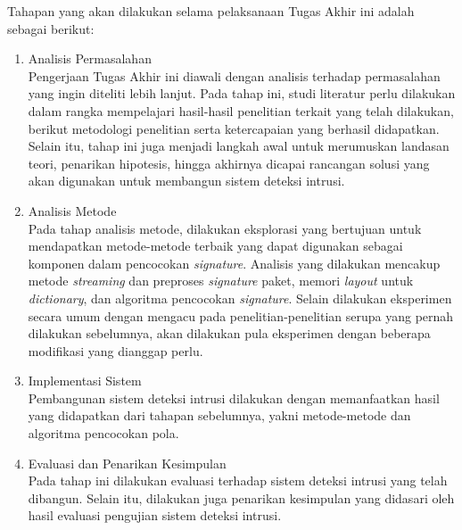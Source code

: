   Tahapan yang akan dilakukan selama pelaksanaan Tugas Akhir ini adalah sebagai berikut:
  \begin{enumerate}

      \item Analisis Permasalahan \\
      Pengerjaan Tugas Akhir ini diawali dengan analisis terhadap permasalahan yang ingin diteliti lebih lanjut. Pada tahap ini, studi literatur perlu dilakukan dalam rangka mempelajari hasil-hasil penelitian terkait yang telah dilakukan, berikut metodologi penelitian serta ketercapaian yang berhasil didapatkan. Selain itu, tahap ini juga menjadi langkah awal untuk merumuskan landasan teori, penarikan hipotesis, hingga akhirnya dicapai rancangan solusi yang akan digunakan untuk membangun sistem deteksi intrusi.

      \item Analisis Metode \\
      Pada tahap analisis metode, dilakukan eksplorasi yang bertujuan untuk mendapatkan metode-metode terbaik yang dapat digunakan sebagai komponen dalam pencocokan \emph{signature}. Analisis yang dilakukan mencakup metode \emph{streaming} dan preproses \emph{signature} paket, memori \emph{layout} untuk \emph{dictionary}, dan algoritma pencocokan \emph{signature}. Selain dilakukan eksperimen secara umum dengan mengacu pada penelitian-penelitian serupa yang pernah dilakukan sebelumnya, akan dilakukan pula eksperimen dengan beberapa modifikasi yang dianggap perlu.

      \item Implementasi Sistem \\
      Pembangunan sistem deteksi intrusi dilakukan dengan memanfaatkan hasil yang didapatkan dari tahapan sebelumnya, yakni metode-metode dan algoritma pencocokan pola.

      \item Evaluasi dan Penarikan Kesimpulan \\
      Pada tahap ini dilakukan evaluasi terhadap sistem deteksi intrusi yang telah dibangun. Selain itu, dilakukan juga penarikan kesimpulan yang didasari oleh hasil evaluasi pengujian sistem deteksi intrusi.

  \end{enumerate}


%  

%  
